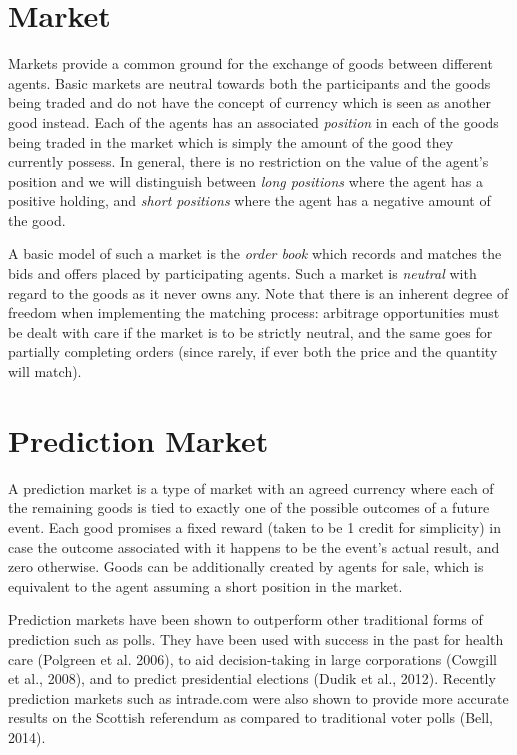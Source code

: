 \documentclass[bsc,frontabs,twoside,singlespacing,parskip,deptreport]{infthesis}     %
\begin{document}
\section{Market}

    Markets provide a common ground for the exchange of goods between different agents. Basic markets are neutral towards both the participants and the goods being traded and do not have the concept of currency which is seen as another good instead. Each of the agents has an associated {\em position} in each of the goods being traded in the market which is simply the amount of the good they currently possess. In general, there is no restriction on the value of the agent's position and we will distinguish between {\em long positions} where the agent has a positive holding, and {\em short positions} where the agent has a negative amount of the good.

    A basic model of such a market is the {\em order book} which records and matches the bids and offers placed by participating agents. Such a market is {\em neutral} with regard to the goods as it never owns any. Note that there is an inherent degree of freedom when implementing the matching process: arbitrage opportunities must be dealt with care if the market is to be strictly neutral, and the same goes for partially completing orders (since rarely, if ever both the price and the quantity will match).


\section{Prediction Market}

    A prediction market is a type of market with an agreed currency where each of the remaining goods is tied to exactly one of the possible outcomes of a future event. Each good promises a fixed reward (taken to be 1 credit for simplicity) in case the outcome associated with it happens to be the event's actual result, and zero otherwise. Goods can be additionally created by agents for sale, which is equivalent to the agent assuming a short position in the market.
    
    Prediction markets have been shown to outperform other traditional forms of prediction such as polls. They have been used with success in the past for health care (Polgreen et al. 2006), to aid decision-taking in large corporations (Cowgill et al., 2008), and to predict presidential elections (Dudik et al., 2012). Recently prediction markets such as intrade.com were also shown to provide more accurate results on the Scottish referendum as compared to traditional voter polls (Bell, 2014).
\end{document}
